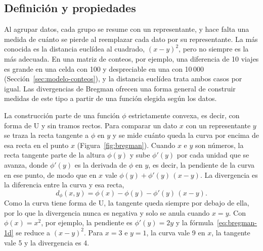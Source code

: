 \subsection{Definición y propiedades}

Al agrupar datos, cada grupo se resume con un representante, y hace falta una
medida de cuánto se pierde al reemplazar cada dato por su representante. La más
conocida es la distancia euclídea al cuadrado, $(x - y)^2$, pero no siempre es la
más adecuada. En una matriz de conteos, por ejemplo, una diferencia de 10 viajes
es grande en una celda con 100 y despreciable en una con 10\,000
(Sección~\ref{sec:modelo-conteos}), y la distancia euclídea trata ambos casos por
igual. Las divergencias de Bregman ofrecen una forma general de construir medidas
de este tipo a partir de una función elegida según los datos.

La construcción parte de una función $\phi$ estrictamente convexa, es decir, con
forma de U y sin tramos rectos. Para comparar un dato $x$ con un representante
$y$ se traza la recta tangente a $\phi$ en $y$ y se mide cuánto queda la curva
por encima de esa recta en el punto $x$ (Figura~\ref{fig:bregman}). Cuando $x$ e
$y$ son números, la recta tangente parte de la altura $\phi(y)$ y sube
$\phi'(y)$ por cada unidad que se avanza, donde $\phi'(y)$ es la derivada de
$\phi$ en $y$, es decir, la pendiente de la curva en ese punto, de modo que en $x$ vale
$\phi(y) + \phi'(y)\,(x - y)$. La divergencia es la diferencia entre la curva y
esa recta,
\begin{equation}\label{eq:bregman-1d}
  d_\phi(x, y) = \phi(x) - \phi(y) - \phi'(y)\,(x - y).
\end{equation}
Como la curva tiene forma de U, la tangente queda siempre por debajo de ella, por
lo que la divergencia nunca es negativa y solo se anula cuando $x = y$. Con
$\phi(x) = x^2$, por ejemplo, la pendiente es $\phi'(y) = 2y$ y la
fórmula~\eqref{eq:bregman-1d} se reduce a $(x - y)^2$. Para $x = 3$ e $y = 1$, la
curva vale 9 en $x$, la tangente vale 5 y la divergencia es 4.

